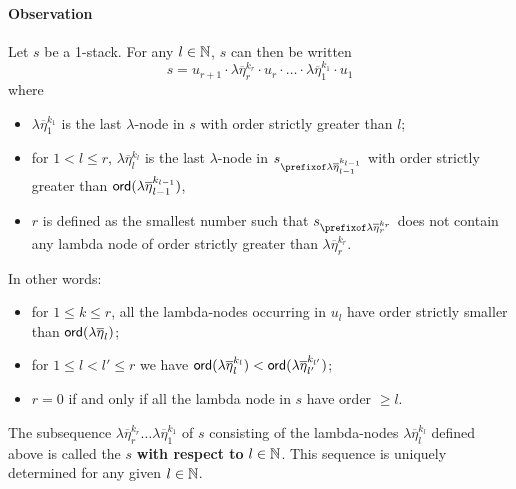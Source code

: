 \documentclass[a4paper,draft]{article}
\theoremstyle{remark}
\theoremstyle{definition}
\begin{document}
\paragraph{Observation}
Let $s$ be a 1-stack. For any $l\in \mathbb{N}$, $s$ can then be written
$$ s = u_{r+1} \cdot \lambda \overline{\eta}_r^{k_r} \cdot u_r \cdot
\ldots \cdot \lambda \overline{\eta}_1^{k_1} \cdot  u_1 $$
where
\begin{itemize}
\item  $\lambda \overline{\eta}_1^{k_1}$ is the
last $\lambda$-node in $s$ with order strictly greater than $l$;

\item for $1 < l \leq r$, $\lambda
\overline{\eta}_l^{k_l}$ is the last $\lambda$-node in $s_{\prefixof
\lambda \overline{\eta}_{l-1}^{k_{l-1}}}$ with order strictly
greater than ${\sf ord}(\lambda \overline{\eta}_{l-1}^{k_{l-1}})$,

\item  $r$ is defined as the smallest number such that
$s_{\prefixof \lambda \overline{\eta}_{r}^{k_{r}}}$ does not contain
any lambda node of order strictly greater than $\lambda
\overline{\eta}_{r}^{k_{r}}$.
\end{itemize}

\noindent In other words:
\begin{itemize}
\item for $1 \leq k \leq r$, all the lambda-nodes occurring in $u_l$ have order
strictly smaller than ${\sf ord}(\lambda \overline{\eta}_l)$;
\item for $1\leq l<l'\leq r$ we have ${\sf ord}(\lambda \overline{\eta}_l^{k_l})
< {\sf ord}(\lambda \overline{\eta}_{l'}^{k_{l'}})$;
\item $r=0$ if and only if all the lambda node in $s$ have order $\geq l$.
\end{itemize}

The subsequence $\lambda \overline{\eta}_r^{k_r} \ldots \lambda\overline{\eta}_1^{k_1}$ of $s$ consisting of the lambda-nodes $\lambda
\overline{\eta}_l^{k_l}$ defined above is called the  $s$ {\bf with respect to} $l\in\mathbb{N}$.
This sequence is uniquely determined for any given $l\in \mathbb{N}$.

\smallskip
\end{document}
